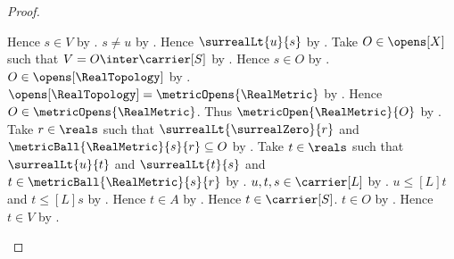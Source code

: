 \begin{proof}
\begin{subproof}
\begin{byCase}
            Hence $s\in V$ by \auto.
            $s\neq u$ by .
            Hence $\surrealLt{u}{s}$ by .
            Take $O\in\opens[X]$ such that
                $V=O\inter\carrier[S]$ by
                .
            Hence $s\in O$ by .
            $O\in\opens[\RealTopology]$ by \auto.
            $\opens[\RealTopology]=\metricOpens{\RealMetric}$ by
                .
            Hence $O\in\metricOpens{\RealMetric}$.
            Thus $\metricOpen{\RealMetric}{O}$ by
                .
            Take $r\in\reals$ such that
                $\surrealLt{\surrealZero}{r}$ and
                $\metricBall{\RealMetric}{s}{r}\subseteq O$ by
                .
            Take $t\in\reals$ such that
                $\surrealLt{u}{t}$ and $\surrealLt{t}{s}$ and
                $t\in\metricBall{\RealMetric}{s}{r}$ by
                .
            $u,t,s\in\carrier[L]$ by \auto.
            $u\mathrel{\leq[L]}t$ and $t\mathrel{\leq[L]}s$ by
                .
            Hence $t\in A$ by .
            Hence $t\in\carrier[S]$.
            $t\in O$ by .
            Hence $t\in V$ by .


\end{byCase}
\end{subproof}
\end{proof}
